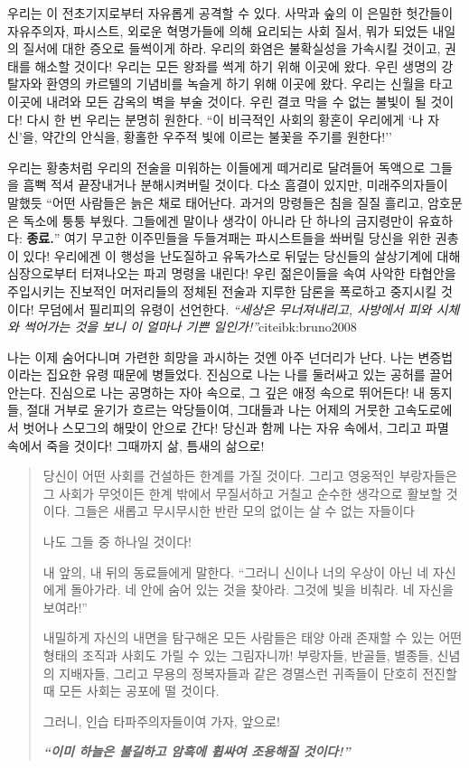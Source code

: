\documentclass[10pt, b6paper, openany]{memoir}
\begin{document}
\begin{article}
우리는 이 전초기지로부터 자유롭게 공격할 수 있다. 사막과 숲의 이 은밀한 헛간들이 자유주의자, 파시스트, 외로운 혁명가들에 의해 요리되는 사회 질서, 뭐가 되었든 내일의 질서에 대한 증오로 들썩이게 하라. 우리의 화염은 불확실성을 가속시킬 것이고, 권태를 해소할 것이다! 우리는 모든 왕좌를 썩게 하기 위해 이곳에 왔다. 우린 생명의 강탈자와 환영의 카르텔의 기념비를 녹슬게 하기 위해 이곳에 왔다. 우리는 신월을 타고 이곳에 내려와 모든 감옥의 벽을 부술 것이다. 우린 결코 막을 수 없는 불빛이 될 것이다! 다시 한 번 우리는 분명히 원한다. ``이 비극적인 사회의 황혼이 우리에게 `나 자신'을, 약간의 안식을, 황홀한 우주적 빛에 이르는 불꽃을 주기를 원한다!''\cite{ibk:renzo2012}

우리는 황충처럼 우리의 전술을 미워하는 이들에게 떼거리로 달려들어 독액으로 그들을 흠뻑 적셔 끝장내거나 분해시켜버릴 것이다. 다소 흠결이 있지만, 미래주의자들이 말했듯 ``어떤 사람들은 늙은 채로 태어난다. 과거의 망령들은 침을 질질 흘리고, 암호문은 독소에 퉁퉁 부웠다. 그들에겐 말이나 생각이 아니라 단 하나의 금지령만이 유효하다: \textbf{종료.}''\cite{atcl:francesco1910} 여기 무고한 이주민들을 두들겨패는 파시스트들을 쏴버릴 당신을 위한 권총이 있다! 우리에겐 이 행성을 난도질하고 유독가스로 뒤덮는 당신들의 살상기계에 대해 심장으로부터 터져나오는 파괴 명령을 내린다! 우린 젊은이들을 속여 사악한 타협안을 주입시키는 진보적인 머저리들의 정체된 전술과 지루한 담론을 폭로하고 중지시킬 것이다! 무덤에서 필리피의 유령이 선언한다. \textit{``세상은 무너져내리고, 사방에서 피와 시체와 썩어가는 것을 보니 이 얼마나 기쁜 일인가!''}cite{ibk:bruno2008}

나는 이제 숨어다니며 가련한 희망을 과시하는 것엔 아주 넌더리가 난다. 나는 변증법이라는 집요한 유령 때문에 병들었다. 진심으로 나는 나를 둘러싸고 있는 공허를 끌어안는다. 진심으로 나는 공명하는 자아 속으로, 그 깊은 애정 속으로 뛰어든다! 내 동지들, 절대 거부로 윤기가 흐르는 악당들이여, 그대들과 나는 어제의 거뭇한 고속도로에서 벗어나 스모그의 해맞이 안으로 간다! 당신과 함께 나는 자유 속에서, 그리고 파멸 속에서 죽을 것이다! 그때까지 삶, 틈새의 삶으로! 

\begin{quote}
당신이 어떤 사회를 건설하든 한계를 가질 것이다. 그리고 영웅적인 부랑자들은 그 사회가 무엇이든 한계 밖에서 무질서하고 거칠고 순수한 생각으로 활보할 것이다. 그들은 새롭고 무시무시한 반란 모의 없이는 살 수 없는 자들이다

나도 그들 중 하나일 것이다! 

내 앞의, 내 뒤의 동료들에게 말한다. ``그러니 신이나 너의 우상이 아닌 네 자신에게 돌아가라. 네 안에 숨어 있는 것을 찾아라. 그것에 빛을 비춰라. 네 자신을 보여라!'' 

내밀하게 자신의 내면을 탐구해온 모든 사람들은 태양 아래 존재할 수 있는 어떤 형태의 조직과 사회도 가릴 수 있는 그림자니까! 부랑자들, 반골들, 별종들, 신념의 지배자들, 그리고 무용의 정복자들과 같은 경멸스런 귀족들이 단호히 전진할 때 모든 사회는 공포에 떨 것이다. 

그러니, 인습 타파주의자들이여 가자, 앞으로! 

\textit{\textbf{``이미 하늘은 불길하고 암흑에 휩싸여 조용해질 것이다!''}}\cite{ibk:renzo2012}
\end{quote}
\end{article}
\end{document}
